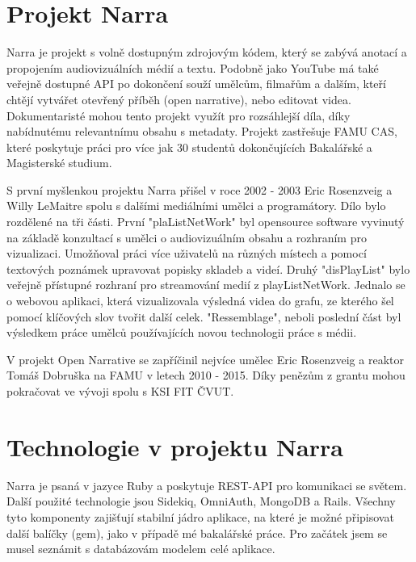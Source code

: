 \section{Projekt Narra}
\par Narra je projekt s volně dostupným zdrojovým kódem, který se zabývá anotací a propojením audiovizuálních médií a textu. Podobně jako YouTube má také veřejně dostupné API po dokončení souží umělcům, filmařům a dalším, kteří chtějí vytvářet otevřený příběh (open narrative), nebo editovat videa. Dokumentaristé mohou tento projekt využít pro rozsáhlejší díla, díky nabídnutému relevantnímu obsahu s metadaty. Projekt zastřešuje FAMU CAS, které poskytuje práci pro více jak 30 studentů dokončujících Bakalářské a Magisterské studium.
\par S první myšlenkou projektu Narra přišel v roce 2002 - 2003 Eric Rosenzveig a Willy LeMaitre spolu s dalšími mediálními umělci a programátory. Dílo bylo rozdělené na tři části. První "plaListNetWork" byl opensource software vyvinutý na základě konzultací s umělci o audiovizuálním obsahu a rozhraním pro vizualizaci. Umožňoval práci více uživatelů na různých místech a pomocí textových poznámek upravovat popisky skladeb a videí. Druhý "disPlayList" bylo veřejně přístupné rozhraní pro streamování medií z playListNetWork. Jednalo se o webovou aplikaci, která vizualizovala výsledná videa do grafu, ze kterého šel pomocí klíčových slov tvořit další celek. "Ressemblage", neboli poslední část byl výsledkem práce umělců používajících novou technologii práce s médii.
\par V projekt Open Narrative se zapříčinil nejvíce umělec Eric Rosenzveig a reaktor Tomáš Dobruška na FAMU v letech 2010 - 2015. Díky penězům z grantu mohou pokračovat ve vývoji spolu s KSI FIT ČVUT.

\section{Technologie v projektu Narra} 
\par Narra je psaná v jazyce Ruby a poskytuje REST-API pro komunikaci se světem. Další použité technologie jsou Sidekiq, OmniAuth, MongoDB a Rails. Všechny tyto komponenty zajišťují stabilní jádro aplikace, na které je možné připisovat další balíčky (gem), jako v případě mé bakalářské práce. Pro začátek jsem se musel seznámit s databázovám modelem celé aplikace.

